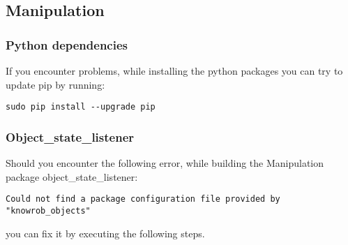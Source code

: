 \documentclass[main.tex]{subfiles}
\begin{document}
	\subsection{Manipulation}
	\subsubsection{Python dependencies}
	If you encounter problems, while installing the python packages you can try to update pip by running:\\
	\begin{lstlisting}
sudo pip install --upgrade pip
\end{lstlisting}

	\subsubsection{Object\_state\_listener}	
	Should you encounter the following error, while building the Manipulation package object\_state\_listener:
	\begin{lstlisting}
Could not find a package configuration file provided by "knowrob_objects"
\end{lstlisting}
you can fix it by executing the following steps.\\
\\	
\end{document}
